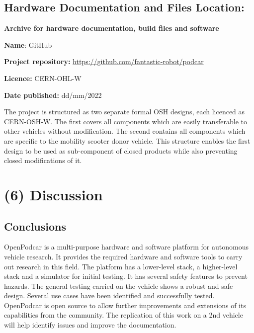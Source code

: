 \documentclass[a4paper]{article}
\begin{document}
	\subsection{Hardware Documentation and Files Location:}\label{h.nbisrsde6sc3}
	
	\textbf{Archive for hardware documentation, build files and software}
	
	\textbf{Name}: GitHub
	
	
	\textbf{Project repository:} \url{https://github.com/fantastic-robot/podcar}
	
	\textbf{Licence:} CERN-OHL-W 
	
	\textbf{Date published:} dd/mm/2022
	
	The project is structured as two separate formal OSH designs, each licenced as CERN-OSH-W. The first covers all components which are easily transferable to other vehicles without modification. The second contains all components which are specific to the mobility scooter donor vehicle. This structure enables the first design to be used as sub-component of closed products while also preventing closed modifications of it.
	
	
	
	\section{(6) Discussion}\label{h.90jl7wm65t65}
	
	\subsection{Conclusions}\label{h.h3fr33ylzsnh}
	
	
	OpenPodcar is a multi-purpose hardware and software platform for autonomous vehicle research. It provides the required hardware and software tools to carry out research in this field. The platform has a lower-level stack, a higher-level stack and a simulator for initial testing. It has several safety features to prevent hazards. The general testing carried on the vehicle shows a robust and safe design. Several use cases have been identified and successfully tested. OpenPodcar is open source to allow further improvements and extensions of its capabilities from the community. The replication of this work on a 2nd vehicle will help identify issues and improve the documentation.
	
\end{document}
